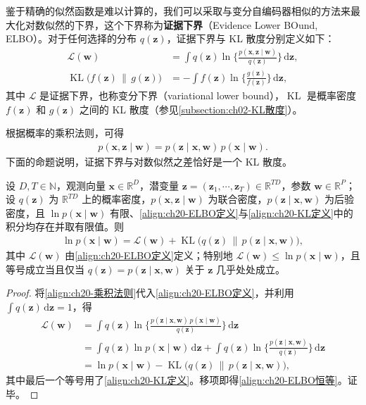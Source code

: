 \documentclass[../../main.tex]{subfiles}
\begin{document}
鉴于精确的似然函数是难以计算的，我们可以采取与变分自编码器相似的方法来最大化对数似然的下界，这个下界称为\textbf{证据下界}（Evidence Lower BOund, ELBO）。对于任何选择的分布 $q(\bm{z})$，证据下界与 KL 散度分别定义如下：
\begin{align}
\mathcal{L}(\bm{w})&=\int q(\bm{z})\ln\Big\{\frac{p(\bm{x},\bm{z}\mid\bm{w})}{q(\bm{z})}\Big\}\,\mathrm{d}\bm{z},
\label{align:ch20-ELBO定义}\\
\operatorname{KL}\big(f(\bm{z})\,\|\,g(\bm{z})\big)&=-\int f(\bm{z})\ln\Big\{\frac{g(\bm{z})}{f(\bm{z})}\Big\}\,\mathrm{d}\bm{z},
\label{align:ch20-KL定义}
\end{align}
其中 $\mathcal{L}$ 是证据下界，也称变分下界（variational lower bound），$\operatorname{KL}$ 是概率密度 $f(\bm{z})$ 和 $g(\bm{z})$ 之间的 KL 散度（参见\cref{subsection:ch02-KL散度}）。

根据概率的乘积法则，可得
\begin{align}
p(\bm{x},\bm{z}\mid\bm{w})=p(\bm{z}\mid\bm{x},\bm{w})\,p(\bm{x}\mid\bm{w}).
\label{align:ch20-乘积法则}
\end{align}
下面的命题说明，证据下界与对数似然之差恰好是一个 KL 散度。

\begin{proposition}[证据下界恒等式]\label{proposition:ch20-ELBO恒等}
设 $D,T\in\mathbb{N}$，观测向量 $\bm{x}\in\mathbb{R}^{D}$，潜变量 $\bm{z}=(\bm{z}_1,\cdots,\bm{z}_T)\in\mathbb{R}^{TD}$，参数 $\bm{w}\in\mathbb{R}^{P}$；设 $q(\bm{z})$ 为 $\mathbb{R}^{TD}$ 上的概率密度，$p(\bm{x},\bm{z}\mid\bm{w})$ 为联合密度，$p(\bm{z}\mid\bm{x},\bm{w})$ 为后验密度，且 $\ln p(\bm{x}\mid\bm{w})$ 有限、\eqref{align:ch20-ELBO定义}与\eqref{align:ch20-KL定义}中的积分均存在并取有限值。则
\begin{align}
\ln p(\bm{x}\mid\bm{w})=\mathcal{L}(\bm{w})+\operatorname{KL}\big(q(\bm{z})\,\|\,p(\bm{z}\mid\bm{x},\bm{w})\big),
\label{align:ch20-ELBO恒等}
\end{align}
其中 $\mathcal{L}(\bm{w})$ 由\eqref{align:ch20-ELBO定义}定义；特别地 $\mathcal{L}(\bm{w})\leqslant\ln p(\bm{x}\mid\bm{w})$，且等号成立当且仅当 $q(\bm{z})=p(\bm{z}\mid\bm{x},\bm{w})$ 关于 $\bm{z}$ 几乎处处成立。
\end{proposition}

\begin{proof}
将\eqref{align:ch20-乘积法则}代入\eqref{align:ch20-ELBO定义}，并利用 $\int q(\bm{z})\,\mathrm{d}\bm{z}=1$，得
\begin{align*}
\mathcal{L}(\bm{w})&=\int q(\bm{z})\ln\Big\{\frac{p(\bm{z}\mid\bm{x},\bm{w})\,p(\bm{x}\mid\bm{w})}{q(\bm{z})}\Big\}\,\mathrm{d}\bm{z}\\
&=\int q(\bm{z})\ln p(\bm{x}\mid\bm{w})\,\mathrm{d}\bm{z}+\int q(\bm{z})\ln\Big\{\frac{p(\bm{z}\mid\bm{x},\bm{w})}{q(\bm{z})}\Big\}\,\mathrm{d}\bm{z}\\
&=\ln p(\bm{x}\mid\bm{w})-\operatorname{KL}\big(q(\bm{z})\,\|\,p(\bm{z}\mid\bm{x},\bm{w})\big),
\end{align*}
其中最后一个等号用了\eqref{align:ch20-KL定义}。移项即得\eqref{align:ch20-ELBO恒等}。证毕。
\end{proof}
\end{document}
